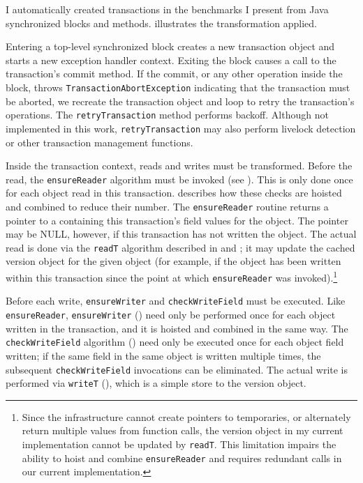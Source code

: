 I automatically created transactions in the benchmarks I present from
Java synchronized blocks and methods.   illustrates
the transformation applied.

Entering a top-level synchronized block creates a new transaction
object and starts a new exception handler context.  Exiting the block
causes a call to the transaction's commit method.  If the commit, or
any other operation inside the block, throws
\texttt{TransactionAbortException} indicating that the transaction
must be aborted, we recreate the transaction object and loop to retry
the transaction's operations.  The \texttt{retryTransaction} method
performs backoff.  Although not implemented in this work,
\texttt{retryTransaction} 
may also perform livelock detection or other
transaction management functions.

Inside the transaction context, reads and writes must be transformed.
Before the read, the \texttt{ensureReader} algorithm
must be invoked (see ).  This
is only done once for each object read in this transaction.
 describes how these checks are hoisted and combined to
reduce their number.  The \texttt{ensureReader} routine returns a
pointer to a  containing this transaction's field
values for the object.  The pointer may be NULL, however, if this
transaction has not written the object.
The actual read is done via the \texttt{readT}
algorithm described in  and ; it may
update the cached version object for the given object (for example, if
the object has been written within this transaction since the point at
which \texttt{ensureReader} was invoked).\footnote{Since the \flex
  infrastructure cannot create pointers to temporaries, or
  alternately return multiple values from function calls, the
  version object in my current implementation cannot be updated by
  \texttt{readT}\@.  This limitation impairs the ability to hoist and combine
  \texttt{ensureReader} and requires redundant calls in our current
  implementation.}

Before each write, \texttt{ensureWriter} and \texttt{checkWriteField}
must be executed.  Like \texttt{ensureReader}, \texttt{ensureWriter}
() need only be performed once for each object
written in the transaction, and it is hoisted and combined in the same
way.  
The \texttt{checkWriteField} algorithm () need
only be executed once for each object field written; if the same field
in the same object is written multiple times, the subsequent
\texttt{checkWriteField} invocations can be eliminated.  The actual
write is performed via \texttt{writeT} (), which is a
simple store to the version object.

